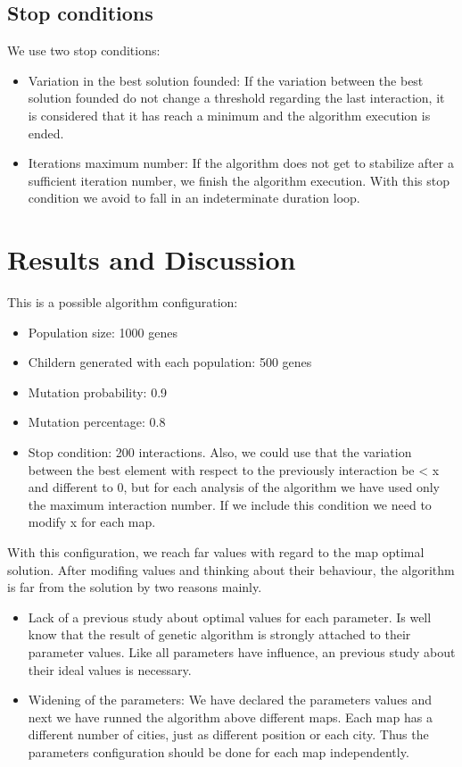 \documentclass{article}
\begin{document}
\subsection{Stop conditions}
We use two stop conditions:
\begin{itemize}
    \item Variation in the best solution founded: If the variation between the best solution founded do not change a threshold regarding the last 
    interaction, it is considered that it has reach a minimum and the algorithm execution is ended.
    \item Iterations maximum number: If the algorithm does not get to stabilize after a sufficient iteration number, we finish the algorithm 
    execution.  With this stop condition we avoid to fall in an indeterminate duration loop. 
\end{itemize}

\section{Results and Discussion}
This is a possible algorithm configuration: 
\begin{itemize}
    \item Population size: 1000 genes
    \item Childern generated with each population: 500 genes
    \item Mutation probability: 0.9
    \item Mutation percentage: 0.8
    \item Stop condition: 200 interactions. Also, we could use that the variation between the best element with respect to the previously interaction
    be < x and different to 0, but for each analysis of the algorithm we have used only the maximum interaction number. If we include this condition 
    we need to modify x for each map.
\end{itemize}
With this configuration, we reach far values with regard to the map optimal solution. After modifing values and thinking about their behaviour, 
the algorithm is far from the solution by two reasons mainly.

\begin{itemize}
    \item Lack of a previous study about optimal values for each parameter. Is well know that the result of genetic algorithm is strongly attached 
    to their parameter values. Like all parameters have influence, an previous study about their ideal values is necessary. 
    \item Widening of the parameters: We have declared the parameters values and next we have runned the algorithm above different maps. Each map 
    has a different number of cities, just as different position or each city. Thus the parameters configuration should be done for each map 
    independently.
\end{itemize}
\end{document}
